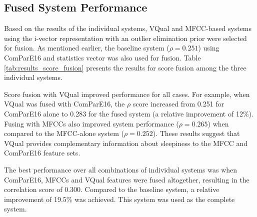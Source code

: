 \subsection{Fused System Performance}

Based on the results of the individual systems, VQual and MFCC-based systems using the i-vector representation with an outlier elimination prior were selected for fusion. As mentioned earlier, the baseline system ($\rho=0.251$) using ComParE16 and statistics vector was also used for fusion.
Table \ref{tab:results_score_fusion} presents the results for score fusion among the three individual systems. %

Score fusion with VQual improved performance for all cases.
For example, when VQual was fused with ComParE16, the $\rho$ score increased from 0.251 for ComParE16 alone to 0.283 for the fused system (a relative improvement of 12\%). %
Fusing with MFCCs also improved system performance ($\rho=0.265$) when compared to the MFCC-alone system ($\rho=0.252$). 
These results suggest that VQual provides complementary information about sleepiness to the MFCC and ComParE16 feature sets.

The best performance over all combinations of individual systems was when ComParE16, MFCCs and VQual features were fused altogether, resulting in the correlation score of 0.300. Compared to the baseline system, a relative improvement of 19.5\% was achieved. This system was used as the complete system.


